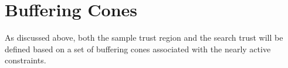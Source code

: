 





% 
% 
% 
% 
% 
% 



\section{Buffering Cones}
\label{buffering_cones}
As discussed above, both the sample trust region and the search trust will be defined based on a set of buffering cones associated with the nearly active constraints.   
  
